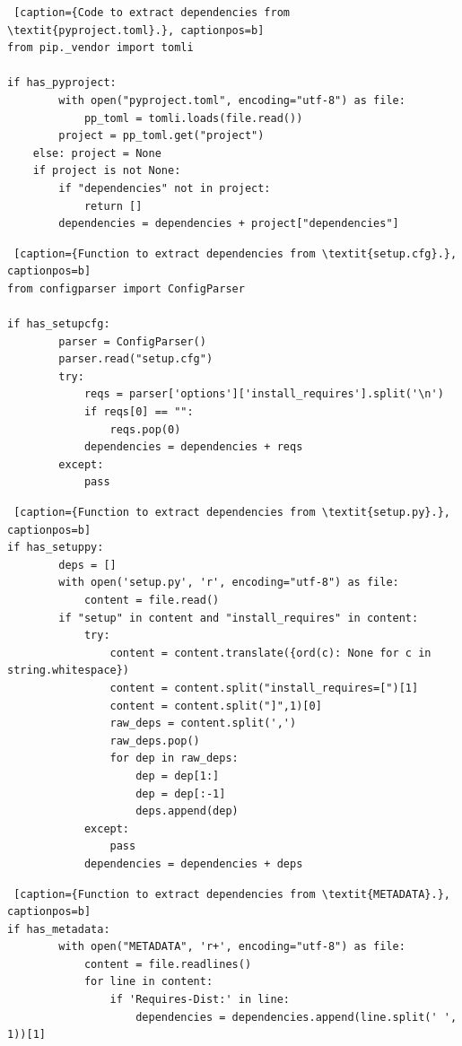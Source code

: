 \begin{lstlisting} [caption={Code to extract dependencies from \textit{pyproject.toml}.}, captionpos=b]
from pip._vendor import tomli

if has_pyproject:
        with open("pyproject.toml", encoding="utf-8") as file:
            pp_toml = tomli.loads(file.read())
        project = pp_toml.get("project")
    else: project = None
    if project is not None:
        if "dependencies" not in project:
            return []
        dependencies = dependencies + project["dependencies"]
\end{lstlisting}

\begin{lstlisting} [caption={Function to extract dependencies from \textit{setup.cfg}.}, captionpos=b]
from configparser import ConfigParser

if has_setupcfg:
        parser = ConfigParser()
        parser.read("setup.cfg")
        try:
            reqs = parser['options']['install_requires'].split('\n')
            if reqs[0] == "":
                reqs.pop(0)
            dependencies = dependencies + reqs
        except:
            pass
\end{lstlisting}

\begin{lstlisting} [caption={Function to extract dependencies from \textit{setup.py}.}, captionpos=b]
if has_setuppy:
        deps = []
        with open('setup.py', 'r', encoding="utf-8") as file:
            content = file.read()
        if "setup" in content and "install_requires" in content:
            try:
                content = content.translate({ord(c): None for c in string.whitespace})
                content = content.split("install_requires=[")[1]
                content = content.split("]",1)[0]
                raw_deps = content.split(',')
                raw_deps.pop()
                for dep in raw_deps:
                    dep = dep[1:]
                    dep = dep[:-1]
                    deps.append(dep)
            except:
                pass
            dependencies = dependencies + deps
\end{lstlisting}

\begin{lstlisting} [caption={Function to extract dependencies from \textit{METADATA}.}, captionpos=b]
if has_metadata:
        with open("METADATA", 'r+', encoding="utf-8") as file:
            content = file.readlines()
            for line in content:
                if 'Requires-Dist:' in line:
                    dependencies = dependencies.append(line.split(' ', 1))[1]
\end{lstlisting}


